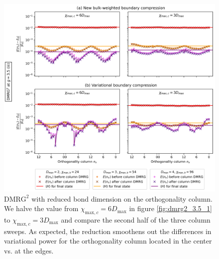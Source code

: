 \newpage
\vspace*{\fill}
\begin{figure}[H]
  \centering
  \includegraphics[width=1.0\linewidth]{dmrg_6_6_3.5_3.png}
  \caption{$\text{DMRG}^2$ with reduced bond dimension on the orthogonality column. We halve the value from $\chi_{\text{max}, c} = 6D_{\text{max}}$ in figure \ref{fig:dmrg2_3.5_1} to $\chi_{\text{max}, c} = 3D_{\text{max}}$ and compare the second half of the three column sweeps. As expected, the reduction smoothens out the differences in variational power for the orthogonality column located in the center vs. at the edges.}
\label{fig:dmrg2_3.5_3}
\end{figure}
\vspace*{\fill}

